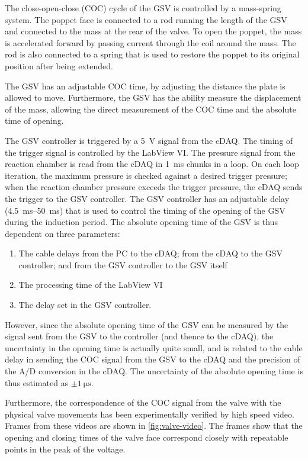 \documentclass[../main.tex]{subfiles}
\begin{document}
The close-open-close (COC) cycle of the GSV is controlled by a mass-spring
system. The poppet face is connected to a rod running the length of the
GSV and connected to the mass at the rear of the valve. To open the poppet,
the mass is accelerated forward by passing current through the coil around
the mass. The rod is also
connected to a spring that is used to restore the poppet to its original
position after being extended.

The GSV has an adjustable COC time, by adjusting the
distance the plate is allowed to move. Furthermore, the GSV has the ability
measure the displacement of the mass, allowing the direct measurement of
the COC time and the absolute time of opening.

The GSV controller is triggered by a \SI{5}{\volt} signal from the cDAQ.
The timing of the trigger signal is controlled by the LabView VI. The pressure
signal from the reaction chamber is read from the cDAQ in \SI{1}{\milli\second}
chunks in a loop. On each loop iteration, the maximum pressure is checked
against a desired trigger pressure; when the reaction chamber pressure exceeds
the trigger pressure, the cDAQ sends the trigger to the GSV controller. The
GSV controller has an adjustable delay  (\SIrange{4.5}{50}{\milli\second}) that
is used to control the timing of the opening of the GSV during the induction period.
The absolute opening time of the GSV is thus dependent on three parameters:
\begin{enumerate}
\item The cable delays from the PC to the cDAQ; from the cDAQ to the GSV
      controller; and from the GSV controller to the GSV itself
\item The processing time of the LabView VI
\item The delay set in the GSV controller.
\end{enumerate}

However, since the absolute opening time of the GSV can be measured by
the signal sent from the GSV to the controller (and thence to the cDAQ),
the uncertainty in the opening time is actually quite small, and is related
to the cable delay in sending the COC signal from the GSV to the cDAQ and
the precision of the A/D conversion in the cDAQ. The uncertainty of the
absolute opening time is thus estimated as $\pm \SI{1}{\micro\second}$. 

Furthermore, the correspondence of the COC signal from the valve with
the physical valve movements has been experimentally verified by
high speed video. Frames from these videos are shown in \cref{fig:valve-video}.
The frames show that the opening and closing times of the valve face
correspond closely with repeatable points in the peak of the voltage.
\end{document}
